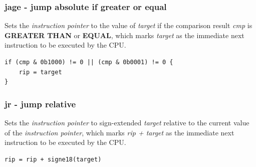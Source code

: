 \documentclass[a4paper,10pt]{article}
\begin{document}

\subsubsection{jage - jump absolute if greater or equal}
	{Sets the \emph{instruction pointer} to the value of \emph{target} if the comparison result \emph{cmp} is \textbf{GREATER THAN} or \textbf{EQUAL}, which marks \emph{target} as the immediate next instruction to be executed by the CPU.}
\begin{lstlisting}
if (cmp & 0b1000) != 0 || (cmp & 0b0001) != 0 {
	rip = target
}
\end{lstlisting}


\subsubsection{jr - jump relative}
	{Sets the \emph{instruction pointer} to sign-extended \emph{target} relative to the current value of the \emph{instruction pointer}, which marks \emph{rip + target} as the immediate next instruction to be executed by the CPU.}
\begin{lstlisting}
rip = rip + signe18(target)
\end{lstlisting}
\end{document}
